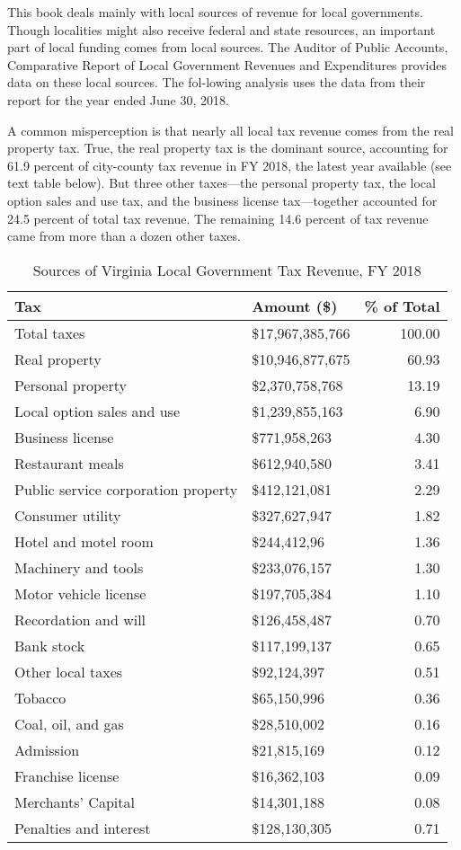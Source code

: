 \documentclass[
]{book}
\begin{document}
This book deals mainly with local sources of revenue for local governments. Though localities might also receive federal and state resources, an important part of local funding comes from local sources. The Auditor of Public Accounts, Comparative Report of Local Government Revenues and Expenditures provides data on these local sources. The fol-lowing analysis uses the data from their report for the year ended June 30, 2018.

A common misperception is that nearly all local tax revenue comes from the real property tax. True, the real property tax is the dominant source, accounting for 61.9 percent of city-county tax revenue in FY 2018, the latest year available (see text table below). But three other taxes---the personal property tax, the local option sales and use tax, and the business license tax---together accounted for 24.5 percent of total tax revenue. The remaining 14.6 percent of tax revenue came from more than a dozen other taxes.

\begin{table}

\caption{\label{tab:unnamed-chunk-2}Sources of Virginia Local Government Tax Revenue, FY 2018}
\centering
\begin{tabular}[t]{l|l|r}
\hline
Tax & Amount (\$) & \% of Total\\
\hline
Total taxes & \$17,967,385,766 & 100.00\\
\hline
Real property & \$10,946,877,675 & 60.93\\
\hline
Personal property & \$2,370,758,768 & 13.19\\
\hline
Local option sales and use & \$1,239,855,163 & 6.90\\
\hline
Business license & \$771,958,263 & 4.30\\
\hline
Restaurant meals & \$612,940,580 & 3.41\\
\hline
Public service corporation property & \$412,121,081 & 2.29\\
\hline
Consumer utility & \$327,627,947 & 1.82\\
\hline
Hotel and motel room & \$244,412,96 & 1.36\\
\hline
Machinery and tools & \$233,076,157 & 1.30\\
\hline
Motor vehicle license & \$197,705,384 & 1.10\\
\hline
Recordation and will & \$126,458,487 & 0.70\\
\hline
Bank stock & \$117,199,137 & 0.65\\
\hline
Other local taxes & \$92,124,397 & 0.51\\
\hline
Tobacco & \$65,150,996 & 0.36\\
\hline
Coal, oil, and gas & \$28,510,002 & 0.16\\
\hline
Admission & \$21,815,169 & 0.12\\
\hline
Franchise license & \$16,362,103 & 0.09\\
\hline
Merchants' Capital & \$14,301,188 & 0.08\\
\hline
Penalties and interest & \$128,130,305 & 0.71\\
\hline
\end{tabular}
\end{table}
\end{document}
